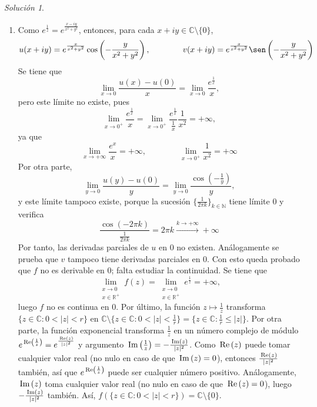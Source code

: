 \documentclass[11pt]{report}
\newcommand{\R}{\mathbb R}
\newcommand{\N}{\mathbb N}
\newcommand{\C}{\mathbb C}
\newcommand{\pars}[1]{\left( #1 \right)} %
\renewcommand{\Re}[1]{\,\textup{Re}\pars{#1}}
\renewcommand{\Im}[1]{\,\textup{Im}\pars{#1}}
\theoremstyle{remark}
\newtheorem*{resolution}{Solución}
\begin{document}
\begin{resolution}
\hfill
\begin{enumerate}
    \item Como $e^{\frac{1}{z}} = e^{\frac{x-iy}{x^2+y^2}}$, entonces, para cada $x+iy \in \C \setminus \{0\}$,
    \[u(x+iy) = e^{\frac{x}{x^2+y^2}}\cos\left(-\frac{y}{x^2+y^2}\right), \qquad \qquad v(x+iy) = e^{\frac{x}{x^2+y^2}}\sen\left(-\frac{y}{x^2+y^2}\right)\]
    Se tiene que
    \[\lim_{x \to 0} \frac{u(x)-u(0)}{x} = \lim_{x \to 0} \frac{e^{\frac{1}{x}}}{x},\]
    pero este límite no existe, pues
    \[\lim_{x \to 0^+} \frac{e^{\frac{1}{x}}}{x} = \lim_{x \to 0^+} \frac{e^{\frac{1}{x}}}{\frac{1}{x}} \frac{1}{x^2} = +\infty,\]
    ya que
    \[\lim_{x \to +\infty} \frac{e^x}{x} = +\infty, \qquad \qquad \lim_{x \to 0^+} \frac{1}{x^2} = +\infty\]
    Por otra parte,
    \[\lim_{y \to 0} \frac{u(y)-u(0)}{y} = \lim_{y \to 0} \frac{\cos\left(-\frac{1}{y}\right)}{y},\]
    y este límite tampoco existe, porque la sucesión $\{\frac{1}{2\pi k}\}_{k\in \N}$ tiene límite $0$ y verifica
    \[\frac{\cos\left(-2\pi k \right)}{\frac{1}{2\pi k}} = 2\pi k \xrightarrow[]{k \to +\infty} +\infty\]
    Por tanto, las derivadas parciales de $u$ en $0$ no existen. Análogamente se prueba que $v$ tampoco tiene derivadas parciales en $0$. Con esto queda probado que $f$ no es derivable en $0$; falta estudiar la continuidad. Se tiene que
    \[\lim_{\substack{x \to 0 \\ x \in \R^+}} f(z) = \lim_{\substack{x \to 0 \\ x \in \R^+}} e^{\frac{1}{z}} = +\infty,\]
    luego $f$ no es continua en $0$. Por último, la función $z \mapsto \frac{1}{z}$ transforma $\{z \in \C \colon 0<|z|<r\}$ en $\C \setminus \{z \in \C \colon 0 < |z| < \frac{1}{r}\} = \{z \in \C \colon \frac{1}{r} \leq |z|\}$. Por otra parte, la función exponencial transforma $\frac{1}{z}$ en un número complejo de módulo $e^{\Re{\frac{1}{z}}} = e^{\frac{\Re{z}}{|z|^2}}$ y argumento
    $\Im{\frac{1}{z}} = -\frac{\Im{z}}{|z|^2}$. Como $\Re{z}$ puede tomar cualquier valor real (no nulo en caso de que $\Im{z} = 0$), entonces $\frac{\Re{z}}{|z|^2}$ también, así que $e^{\Re{\frac{1}{z}}}$ puede ser cualquier número positivo. Análogamente, $\Im{z}$ toma cualquier valor real (no nulo en caso de que $\Re{z} = 0$), luego $-\frac{\Im{z}}{|z|^2}$ también. Así, $f(\{z \in \C \colon 0<|z|<r\}) = \C \setminus \{0\}$.


\end{enumerate}
\end{resolution}
\end{document}
